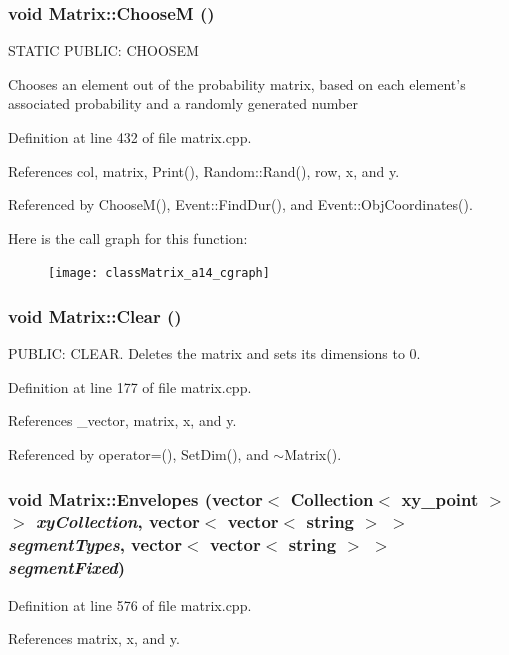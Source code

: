 \subsubsection{\setlength{\rightskip}{0pt plus 5cm}void Matrix::Choose\-M ()}\label{classMatrix_a14}


STATIC PUBLIC: CHOOSEM

Chooses an element out of the probability matrix, based on each element's associated probability and a randomly generated number 

Definition at line 432 of file matrix.cpp.

References col, matrix, Print(), Random::Rand(), row, x, and y.

Referenced by Choose\-M(), Event::Find\-Dur(), and Event::Obj\-Coordinates().

Here is the call graph for this function:\begin{figure}[H]
\begin{center}
\leavevmode
\texttt{[image: classMatrix\_a14\_cgraph]}
\end{center}
\end{figure}
\subsubsection{\setlength{\rightskip}{0pt plus 5cm}void Matrix::Clear ()}\label{classMatrix_a29}


PUBLIC: CLEAR. Deletes the matrix and sets its dimensions to 0. 

Definition at line 177 of file matrix.cpp.

References \_\-vector, matrix, x, and y.

Referenced by operator=(), Set\-Dim(), and $\sim$Matrix().
\subsubsection{\setlength{\rightskip}{0pt plus 5cm}void Matrix::Envelopes (vector$<$ Collection$<$ xy\_\-point $>$ $>$ {\em xy\-Collection}, vector$<$ vector$<$ string $>$ $>$ {\em segment\-Types}, vector$<$ vector$<$ string $>$ $>$ {\em segment\-Fixed})}\label{classMatrix_a20}




Definition at line 576 of file matrix.cpp.

References matrix, x, and y.
